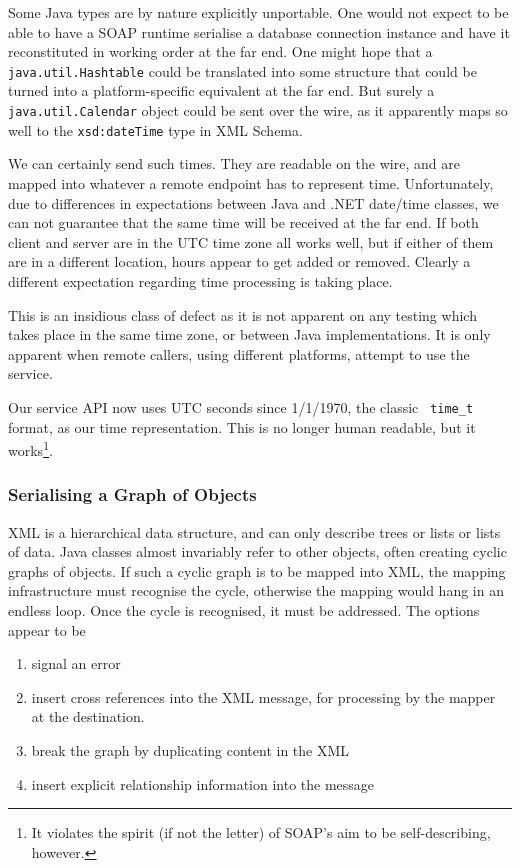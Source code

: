 Some Java types are by nature explicitly unportable. One would not
expect to be able to have a SOAP runtime serialise a database
connection instance and have it reconstituted in working order at the
far end. One might hope that a {\tt java.util.Hashtable} could be
translated into some structure that could be turned into a
platform-specific equivalent at the far end. But surely a {\tt
java.util.Calendar} object could be sent over the wire, as it
apparently maps so well to the {\tt xsd:dateTime} type in XML Schema.

We can certainly send such times. They are readable on the wire, and
are mapped into whatever a remote endpoint has to represent
time. Unfortunately, due to differences in expectations between Java
and .NET date/time classes, we can not guarantee that the same time
will be received at the far end. If both client and server are in the
UTC time zone all works well, but if either of them are in a different
location, hours appear to get added or removed. Clearly a different
expectation regarding time processing is taking place.

This is an insidious class of defect as it is not apparent on any
testing which takes place in the same time zone, or between Java
implementations. It is only apparent when remote callers, using
different platforms, attempt to use the service.

Our service API now uses UTC seconds since 1/1/1970, the classic {\tt
time\_t} format, as our time representation. This is no longer human
readable, but it works\footnote{It violates the spirit (if not the
letter) of SOAP's aim to be self-describing, however.}.

\subsubsection{Serialising a Graph of Objects}
\label{objections:o-x:graphs}

XML is a hierarchical data structure, and can only describe trees or lists 
or lists of data. Java classes almost invariably refer to other objects, often 
creating cyclic graphs of objects. If such a cyclic graph is to be mapped into XML,
the mapping infrastructure must recognise the cycle, otherwise the mapping would
hang in an endless loop. Once the cycle is recognised, it must be addressed. The
options appear to be
\begin{enumerate}
\item signal an error
\item insert cross references into the XML message, for processing by the mapper
at the destination.
\item break the graph by duplicating content in the XML
\item insert explicit relationship information into the message 
\end{enumerate}


